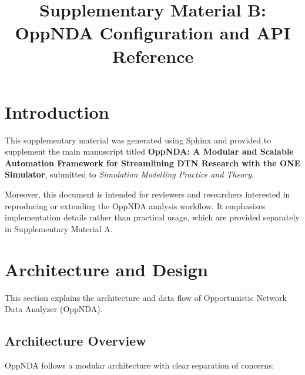 \documentclass[a4paper,11pt,english,openany,oneside]{sphinxmanual}
\title{Supplementary Material B:\\
OppNDA Configuration and API Reference}
\author{}
\date{}
\begin{document}
\pagestyle{empty}
\sphinxmaketitle
\pagestyle{plain}
\sphinxtableofcontents
 
\chapter{Introduction}

\sphinxAtStartPar
    This supplementary material was generated using Sphinx and provided to supplement the main manuscript titled \textbf{OppNDA: A Modular and Scalable Automation Framework for Streamlining DTN Research with the ONE Simulator},  submitted to \emph{Simulation Modelling Practice and Theory}.
    
    Moreover, this document is intended for reviewers and researchers interested
in reproducing or extending the OppNDA analysis workflow. It emphasizes implementation details rather than practical usage, which are provided separately in
Supplementary Material A.
\vspace*{\fill}
\newpage
\pagestyle{normal}
\label{\detokenize{index::doc}}


\sphinxstepscope


\chapter{Architecture and Design}
\label{\detokenize{developer_guide:developer-guide}}\label{\detokenize{developer_guide::doc}}
\sphinxAtStartPar
This section explains the architecture and data flow of Opportunistic Network Data Analyzer (OppNDA).


\section{Architecture Overview}
\label{\detokenize{developer_guide:architecture-overview}}
\sphinxAtStartPar
OppNDA follows a modular architecture with clear separation of concerns:
\end{document}
